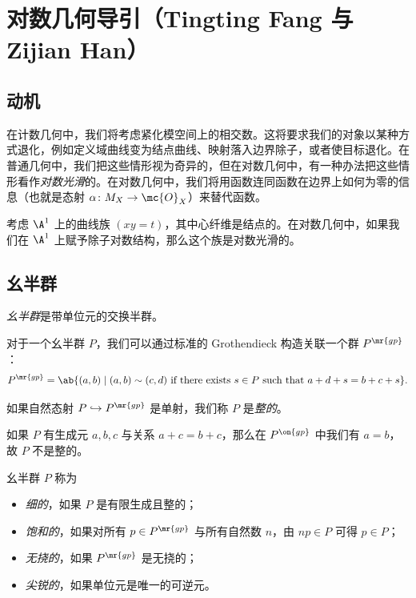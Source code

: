 \section{对数几何导引（Tingting Fang 与 Zijian Han）}%
\label{sec:Intro to log geometry (Tingting Fang and Zijian Han)}

\subsection{动机}%
\label{sub:Motivation}

在计数几何中，我们将考虑紧化模空间上的相交数。这将要求我们的对象以某种方式退化，例如定义域曲线变为结点曲线、映射落入边界除子，或者使目标退化。在普通几何中，我们把这些情形视为奇异的，但在对数几何中，有一种办法把这些情形看作\textit{对数光滑}的。在对数几何中，我们将用函数连同函数在边界上如何为零的信息（也就是态射 \(\alpha \colon M_X \to \mc{O}_X\)）来替代函数。

\begin{exm}
    考虑 \(\A^1\) 上的曲线族 \((xy=t)\)，其中心纤维是结点的。在对数几何中，如果我们在 \(\A^1\) 上赋予除子对数结构，那么这个族是对数光滑的。
\end{exm}

\subsection{幺半群}%
\label{sub:Monoids}

\begin{defn}
    \textit{幺半群}是带单位元的交换半群。
\end{defn}

对于一个幺半群 \(P\)，我们可以通过标准的 Grothendieck 构造关联一个群 \(P^{\mr{gp}}\)：
\[ P^{\mr{gp}} = \ab\{(a,b) \mid (a,b) \sim (c,d) \text{ if there exists } s \in P \text{ such that } a+d+s = b+c+s \}. \]
\begin{defn}
如果自然态射 \(P \hookrightarrow P^{\mr{gp}}\) 是单射，我们称 \(P\) 是\textit{整的}。
\end{defn}

\begin{exm}
    如果 \(P\) 有生成元 \(a,b,c\) 与关系 \(a+c=b+c\)，那么在 \(P^{\on{gp}}\) 中我们有 \(a = b\)，故 \(P\) 不是整的。
\end{exm}

\begin{defn}
    幺半群 \(P\) 称为
    \begin{itemize}
        \item \textit{细的}，如果 \(P\) 是有限生成且整的；
        \item \textit{饱和的}，如果对所有 \(p \in P^{\mr{gp}}\) 与所有自然数 \(n\)，由 \(np \in P\) 可得 \(p \in P\)；
        \item \textit{无挠的}，如果 \(P^{\mr{gp}}\) 是无挠的；
        \item \textit{尖锐的}，如果单位元是唯一的可逆元。
    \end{itemize}
\end{defn}

